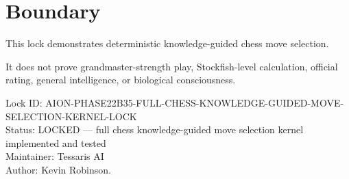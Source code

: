 \documentclass[11pt,a4paper]{article}
\begin{document}
\section{Boundary}

This lock demonstrates deterministic knowledge-guided chess move selection.

It does not prove grandmaster-strength play, Stockfish-level calculation, official rating, general intelligence, or biological consciousness.

\bigskip

\noindent
Lock ID: AION-PHASE22B35-FULL-CHESS-KNOWLEDGE-GUIDED-MOVE-SELECTION-KERNEL-LOCK\\
Status: LOCKED --- full chess knowledge-guided move selection kernel implemented and tested\\
Maintainer: Tessaris AI\\
Author: Kevin Robinson.
\end{document}

